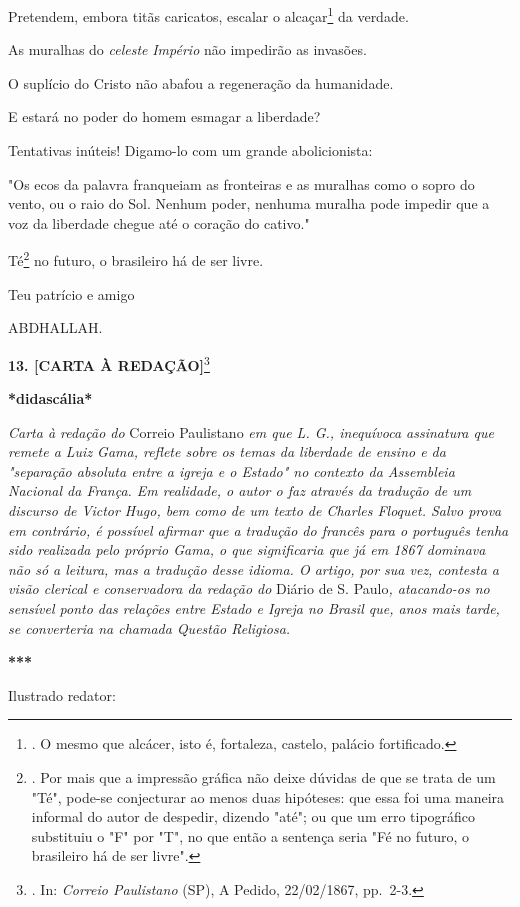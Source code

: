 Pretendem, embora titãs caricatos, escalar o alcaçar\footnote{. O mesmo
  que alcácer, isto é, fortaleza, castelo, palácio fortificado.} da
verdade.

As muralhas do \emph{celeste} \emph{Império} não impedirão as invasões.

O suplício do Cristo não abafou a regeneração da humanidade.

E estará no poder do homem esmagar a liberdade?

Tentativas inúteis! Digamo-lo com um grande abolicionista:

"Os ecos da palavra franqueiam as fronteiras e as muralhas como o sopro
do vento, ou o raio do Sol. Nenhum poder, nenhuma muralha pode impedir
que a voz da liberdade chegue até o coração do cativo."

Té\footnote{. Por mais que a impressão gráfica não deixe dúvidas de que
  se trata de um "Té", pode-se conjecturar ao menos duas hipóteses: que
  essa foi uma maneira informal do autor de despedir, dizendo "até"; ou
  que um erro tipográfico substituiu o "F" por "T", no que então a
  sentença seria "Fé no futuro, o brasileiro há de ser livre".} no
futuro, o brasileiro há de ser livre.

Teu patrício e amigo

ABDHALLAH.

\textbf{13. {[}CARTA À REDAÇÃO{]}}\footnote{. In: \emph{Correio
  Paulistano} (SP), A Pedido, 22/02/1867, pp.~2-3.}

\textbf{*didascália*}

\emph{Carta à redação do} Correio Paulistano \emph{em que L. G.,
inequívoca assinatura que remete a Luiz Gama, reflete sobre os temas da
liberdade de ensino e da "separação absoluta entre a igreja e o Estado"
no contexto da Assembleia Nacional da França. Em realidade, o autor o
faz através da tradução de um discurso de Victor Hugo, bem como de um
texto de Charles Floquet. Salvo prova em contrário, é possível afirmar
que a tradução do francês para o português tenha sido realizada pelo
próprio Gama, o que significaria que já em 1867 dominava não só a
leitura, mas a tradução desse idioma. O artigo, por sua vez, contesta a
visão clerical e conservadora da redação do} Diário de S. Paulo\emph{,
atacando-os no sensível ponto das relações entre Estado e Igreja no
Brasil que, anos mais tarde, se converteria na chamada Questão
Religiosa.}

\textbf{***}

Ilustrado redator:

